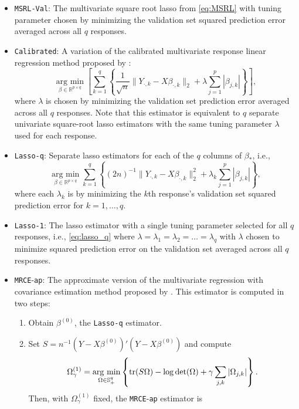 \documentclass[12pt]{article}
\newcommand{\argmin}{\operatorname*{arg \ min}}
\begin{document}
\begin{itemize}
	\item \texttt{MSRL-Val}: The multivariate square root lasso from \eqref{eq:MSRL} with tuning parameter chosen by minimizing the validation set squared prediction error averaged across all $q$ responses. 
	\item \texttt{Calibrated}: A variation of the calibrated multivariate response linear regression method proposed by \citet{liu2015calibrated}: 
		$$\argmin_{\beta \in \mathbb{R}^{p \times q}} \left[ \sum_{k=1}^{q} \left\{ \frac{1}{\sqrt{n}} \|Y_{\cdot,k} - X \beta_{\cdot, k}\|_2   + \lambda \sum_{j=1}^p |\beta_{j,k}| \right\} \right],$$
		where $\lambda$ is chosen by minimizing the validation set prediction error averaged across all $q$ responses. Note that this estimator is equivalent to $q$ separate univariate square-root lasso estimators \citep{belloni2011square} with the same tuning parameter $\lambda$ used for each response. 
	\item \texttt{Lasso-q}: Separate lasso estimators for each of the $q$ columns of $\beta_*$, i.e., 
	\begin{equation}\label{eq:lasso_q} 
	\argmin_{\beta \in \mathbb{R}^{p \times q}} \sum_{k=1}^{q} \left\{ (2n)^{-1}\|Y_{\cdot,k} - X \beta_{\cdot, k}\|_2^2   + \lambda_k \sum_{j=1}^p|\beta_{j,k}|\right\},
	\end{equation}
	where each $\lambda_k$ is by minimizing the $k$th response's validation set squared prediction error for $k=1, \dots, q$. 
	\item \texttt{Lasso-1}: The lasso estimator with a single tuning parameter selected for all $q$ responses, i.e., 
	\eqref{eq:lasso_q} where $\lambda = \lambda_1 = \lambda_2 = \dots = \lambda_q$ with $\lambda$ chosen to minimize squared prediction error on the validation set averaged across all $q$ responses. 
	\item \texttt{MRCE}-\texttt{ap}: The approximate version of the multivariate regression with covariance estimation method proposed by \citet{rothman2010sparse}. This estimator is computed in two steps: 
	\begin{enumerate}
		\item Obtain $\beta^{(0)}$, the \texttt{Lasso-q} estimator. 
		\item Set $S = n^{-1} (Y - X \beta^{(0)})'(Y - X \beta^{(0)})$ and compute 
		$$\Omega^{(1)}_\gamma = \argmin_{\Omega \in \mathbb{S}^q_+} \left\{  {\rm tr}(S\Omega) - \log {\rm det}(\Omega) + \gamma \sum_{j,k}|\Omega_{j,k}| \right\}.$$ Then, with $\Omega_\gamma^{(1)}$ fixed, the \texttt{MRCE}-\texttt{ap} estimator is

\end{enumerate}
\end{itemize}
\end{document}
